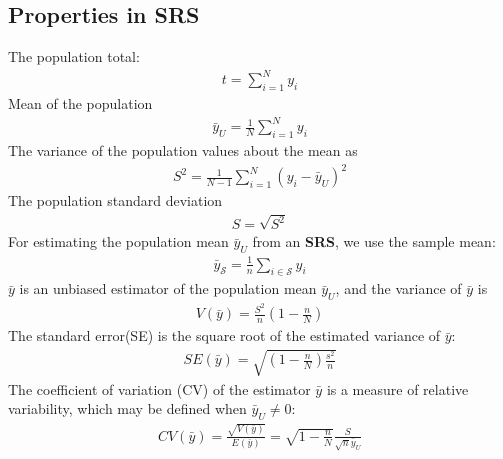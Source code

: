 \documentclass[a4paper,twoside,11pt]{article}
\begin{document}
\subsection{Properties in SRS}
The population total:
\begin{equation*}
\begin{aligned}
t = \sum^N_{i=1} y_i
\end{aligned}
\end{equation*}
Mean of the population
\begin{equation*}
\begin{aligned}
\bar{y}_U = \frac{1}{N}\sum^N_{i=1} y_i
\end{aligned}
\end{equation*}
The variance of the population values about the mean as
\begin{equation*}
\begin{aligned}
S^2 = \frac{1}{N-1} \sum^N_{i=1} (y_i - \bar{y}_U)^2
\end{aligned}
\end{equation*}
The population standard deviation
\begin{equation*}
\begin{aligned}
S = \sqrt{S^2}
\end{aligned}
\end{equation*}
For estimating the population mean $\bar{y}_U$ from an \textbf{SRS}, we use the sample mean:
\begin{equation*}
\begin{aligned}
\bar{y}_{\mathcal{S}} = \frac{1}{n} \sum_{i \in \mathcal{S}}y_i
\end{aligned}
\end{equation*}
$\bar{y}$ is an unbiased estimator of the population mean $\bar{y}_U$, and the variance of $\bar{y}$ is 
\begin{equation*}
\begin{aligned}
V(\bar{y}) = \frac{S^2}{n}(1-\frac{n}{N})
\end{aligned}
\end{equation*}
The standard error(SE) is the square root of the estimated variance of $\bar{y}:$ 
\begin{equation*}
\begin{aligned}
SE(\bar{y}) = \sqrt{(1-\frac{n}{N})\frac{s^2}{n}}
\end{aligned}
\end{equation*}
The coefficient of variation (CV) of the estimator $\bar{y}$ is a measure of relative variability, which may be defined when $\bar{y}_U \ne 0:$
\begin{equation*}
\begin{aligned}
CV(\bar{y}) = \frac{\sqrt{V(\bar{y})}}{E(\bar{y})} = \sqrt{1-\frac{n}{N}}\frac{S}{\sqrt{n}\bar{y}_U}
\end{aligned}
\end{equation*}
\end{document}

